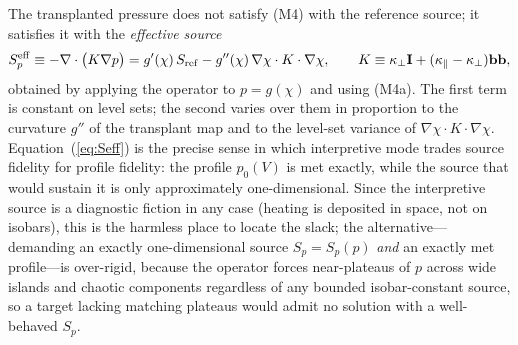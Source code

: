\documentclass[english]{article}
\newcommand{\bb}{\mathbf{b}}
\newcommand{\bI}{\mathbf{I}}
\begin{document}
The transplanted pressure does not satisfy (M4) with the reference source; it satisfies it with the
\emph{effective source}
\begin{equation}
S_p^{\rm eff}\equiv-\nabla\cdot\big(K\nabla p\big)
=g'(\chi)\,S_{\rm ref}-g''(\chi)\,\nabla\chi\cdot K\cdot\nabla\chi ,
\qquad K\equiv\kappa_\perp\bI+(\kappa_\parallel-\kappa_\perp)\bb\bb ,
\label{eq:Seff}
\end{equation}
obtained by applying the operator to $p=g(\chi)$ and using (M4a). The first term is constant on
level sets; the second varies over them in proportion to the curvature $g''$ of the transplant map
and to the level-set variance of $\nabla\chi\cdot K\cdot\nabla\chi$. Equation~(\ref{eq:Seff}) is
the precise sense in which interpretive mode trades source fidelity for profile fidelity: the
profile $p_0(V)$ is met exactly, while the source that would sustain it is only approximately
one-dimensional. Since the interpretive source is a diagnostic fiction in any case (heating is
deposited in space, not on isobars), this is the harmless place to locate the slack; the
alternative---demanding an exactly one-dimensional source $S_p=S_p(p)$ \emph{and} an exactly met
profile---is over-rigid, because the operator forces near-plateaus of $p$ across wide islands and
chaotic components regardless of any bounded isobar-constant source, so a target lacking matching
plateaus would admit no solution with a well-behaved $S_p$.
\end{document}
